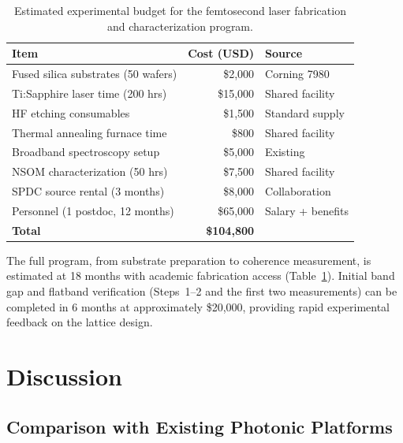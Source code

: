 \documentclass[10pt,letterpaper]{article}
\begin{document}
\begin{table}[h]
	\centering
	\caption{Estimated experimental budget for the femtosecond laser fabrication and characterization program.}
	\label{tab:budget}
	\begin{tabular}{lrl}
		\toprule
		\textbf{Item}                       & \textbf{Cost (USD)} & \textbf{Source}   \\
		\midrule
		Fused silica substrates (50 wafers) & \$2,000             & Corning 7980      \\
		Ti:Sapphire laser time (200 hrs)    & \$15,000            & Shared facility   \\
		HF etching consumables              & \$1,500             & Standard supply   \\
		Thermal annealing furnace time      & \$800               & Shared facility   \\
		Broadband spectroscopy setup        & \$5,000             & Existing          \\
		NSOM characterization (50 hrs)      & \$7,500             & Shared facility   \\
		SPDC source rental (3 months)       & \$8,000             & Collaboration     \\
		Personnel (1 postdoc, 12 months)    & \$65,000            & Salary + benefits \\
		\midrule
		\textbf{Total}                      & \textbf{\$104,800}  &                   \\
		\bottomrule
	\end{tabular}
\end{table}

The full program, from substrate preparation to coherence measurement, is estimated at 18 months with academic fabrication access (Table~\ref{tab:budget}). Initial band gap and flatband verification (Steps~1--2 and the first two measurements) can be completed in 6 months at approximately \$20,000, providing rapid experimental feedback on the lattice design.


\section{Discussion}
\label{sec:discussion}

\subsection{Comparison with Existing Photonic Platforms}
\end{document}
